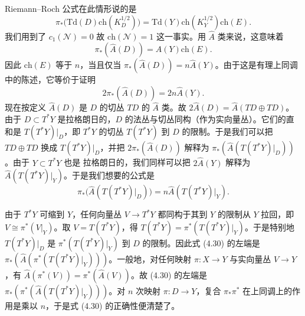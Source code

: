 Riemann--Roch 公式在此情形说的是
\begin{equation}\tag{4.27}
\pi_*\bigl(\mathrm{Td}(D)\mathrm{ch}(K_D^{1/2})\bigr)=\mathrm{Td}(Y)\mathrm{ch}(K_Y^{1/2})\mathrm{ch}(E).
\end{equation}
我们用到了 $c_1(\mathcal{N})=0$ 故 $\mathrm{ch}(\mathcal{N})=1$ 这一事实。用 $\widehat{A}$ 类来说，这意味着
\begin{equation}\tag{4.28}
\pi_*(\widehat{A}(D))=\widehat{A}(Y)\mathrm{ch}(E).
\end{equation}
因此 $\mathrm{ch}(E)$ 等于 $n$，当且仅当 $\pi_*(\widehat{A}(D))=n\widehat{A}(Y)$。由于这是有理上同调中的陈述，它等价于证明
\begin{equation}\tag{4.29}
2\pi_*(\widehat{A}(D))=2n\widehat{A}(Y).
\end{equation}
现在按定义 $\widehat{A}(D)$ 是 $D$ 的切丛 $TD$ 的 $\widehat{A}$ 类。故 $2\widehat{A}(D)=\widehat{A}(TD\oplus TD)$。由于 $D\subset T^*Y$ 是拉格朗日的，$D$ 的法丛与切丛同构（作为实向量丛）。它们的直和是 $T(T^*Y)|_D$，即 $T^*Y$ 的切丛 $T(T^*Y)$ 到 $D$ 的限制。于是我们可以把 $TD\oplus TD$ 换成 $T(T^*Y)|_D$，并把 $2\pi_*(\widehat{A}(D))$ 解释为 $\pi_*(\widehat{A}(T(T^*Y)|_D))$。由于 $Y\subset T^*Y$ 也是
拉格朗日的，我们同样可以把 $2\widehat{A}(Y)$ 解释为 $\widehat{A}(T(T^*Y)|_Y)$。于是我们想要的公式是
\begin{equation}\tag{4.30}
\pi_*\bigl(\widehat{A}(T(T^*Y)|_D)\bigr)=n\widehat{A}(T(T^*Y)|_Y).
\end{equation}

由于 $T^*Y$ 可缩到 $Y$，任何向量丛 $V\to T^*Y$ 都同构于其到 $Y$ 的限制从 $Y$ 拉回，即 $V\cong\pi^*(V|_Y)$。取 $V=T(T^*Y)$，得 $T(T^*Y)=\pi^*(T(T^*Y)|_Y)$。于是特别地 $T(T^*Y)|_D$ 是 $\pi^*(T(T^*Y)|_Y)$ 到 $D$ 的限制。因此式 (4.30) 的左端是 $\pi_*(\widehat{A}(\pi^*(T(T^*Y)|_Y)))$。一般地，对任何映射 $\pi:X\to Y$ 与实向量丛 $V\to Y$，有 $\widehat{A}(\pi^*(V))=\pi^*(\widehat{A}(V))$。故 (4.30) 的左端是 $\pi_*(\pi^*(\widehat{A}(T(T^*Y)|_Y)))$。对 $n$ 次映射 $\pi:D\to Y$，复合 $\pi_*\pi^*$ 在上同调上的作用是乘以 $n$，于是式 (4.30) 的正确性便清楚了。


